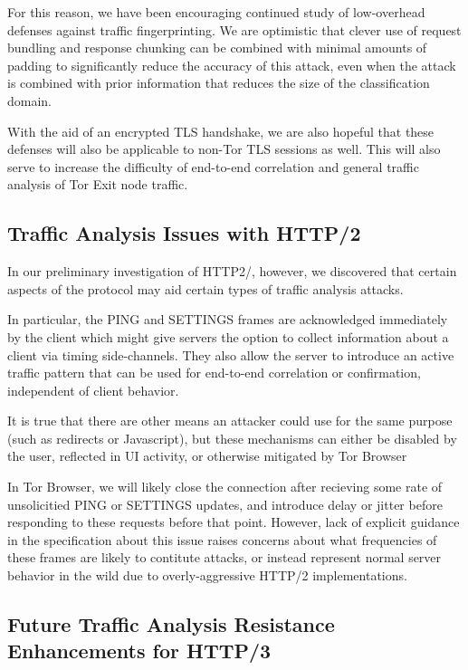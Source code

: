 \documentclass[letterpaper,11pt]{llncs}
\begin{document}
For this reason, we have been encouraging continued study of low-overhead
defenses against traffic fingerprinting. We are optimistic that clever use of
request bundling and response chunking can be combined with minimal amounts of
padding to significantly reduce the accuracy of this attack, even when the
attack is combined with prior information that reduces the size of the
classification domain.

With the aid of an encrypted TLS handshake, we are also hopeful that these
defenses will also be applicable to non-Tor TLS sessions as well. This will
also serve to increase the difficulty of end-to-end correlation and general
traffic analysis of Tor Exit node traffic.


\subsection{Traffic Analysis Issues with HTTP/2}

In our preliminary investigation of HTTP2/, however, we discovered that
certain aspects of the protocol may aid certain types of traffic analysis
attacks.

In particular, the PING and SETTINGS frames are acknowledged immediately by
the client which might give servers the option to collect information about a
client via timing side-channels. They also allow the server to introduce an
active traffic pattern that can be used for end-to-end correlation or
confirmation, independent of client behavior.

It is true that there are other means an attacker could use for the same
purpose (such as redirects or Javascript), but these mechanisms can either be
disabled by the user, reflected in UI activity, or otherwise mitigated by Tor
Browser

In Tor Browser, we will likely close the connection after recieving some rate
of unsolicitied PING or SETTINGS updates, and introduce delay or jitter before
responding to these requests before that point. However, lack of explicit
guidance in the specification about this issue raises concerns about what
frequencies of these frames are likely to contitute attacks, or instead
represent normal server behavior in the wild due to overly-aggressive HTTP/2
implementations.

\subsection{Future Traffic Analysis Resistance Enhancements for HTTP/3}
\end{document}
